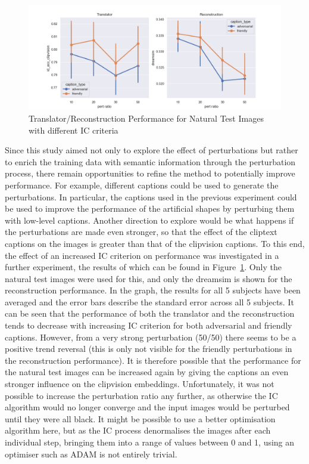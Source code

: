 \begin{figure}[ht]
    \centering
    \includegraphics[width=1\textwidth]{plots/advpert_discussion_explore_pert_ratio_test_translator_and_recon.png}
    \caption{Translator/Reconstruction Performance for Natural Test Images with different IC criteria}\label{fig:advpert_discussion_explore_pert_ratio_test_translator_and_recon}
\end{figure}

Since this study aimed not only to explore the effect of perturbations but rather to enrich the training data with semantic information through the perturbation process, there remain opportunities to refine the method to potentially improve performance. For example, different captions could be used to generate the perturbations. In particular, the captions used in the previous experiment could be used to improve the performance of the artificial shapes by perturbing them with low-level captions. Another direction to explore would be what happens if the perturbations are made even stronger, so that the effect of the cliptext captions on the images is greater than that of the clipvision captions. To this end, the effect of an increased IC criterion on performance was investigated in a further experiment, the results of which can be found in Figure~\ref{fig:advpert_discussion_explore_pert_ratio_test_translator_and_recon}. Only the natural test images were used for this, and only the dreamsim is shown for the reconstruction performance. In the graph, the results for all 5 subjects have been averaged and the error bars describe the standard error across all 5 subjects. It can be seen that the performance of both the translator and the reconstruction tends to decrease with increasing IC criterion for both adversarial and friendly captions. However, from a very strong perturbation (50/50) there seems to be a positive trend reversal (this is only not visible for the friendly perturbations in the reconstruction performance). It is therefore possible that the performance for the natural test images can be increased again by giving the captions an even stronger influence on the clipvision embeddings. Unfortunately, it was not possible to increase the perturbation ratio any further, as otherwise the IC algorithm would no longer converge and the input images would be perturbed until they were all black. It might be possible to use a better optimisation algorithm here, but as the IC process denormalises the images after each individual step, bringing them into a range of values between 0 and 1, using an optimiser such as ADAM\cite{kingmaAdamMethodStochastic2017} is not entirely trivial.

